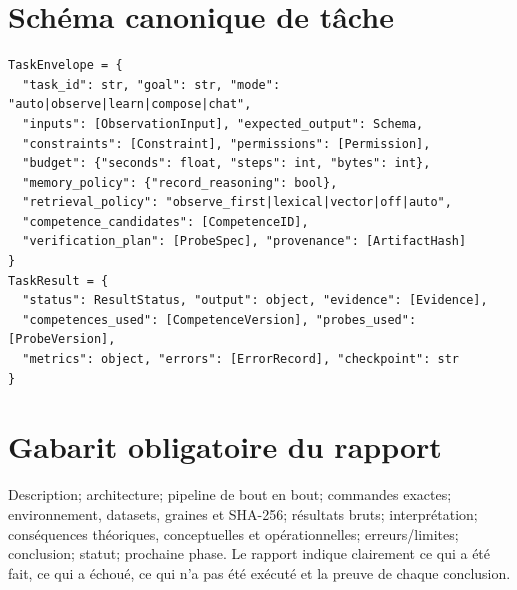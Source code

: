 \documentclass[11pt,a4paper,oneside]{report}
\begin{document}
\appendix
\chapter{Schéma canonique de tâche}
\begin{lstlisting}[basicstyle=\ttfamily\small,breaklines=true]
TaskEnvelope = {
  "task_id": str, "goal": str, "mode": "auto|observe|learn|compose|chat",
  "inputs": [ObservationInput], "expected_output": Schema,
  "constraints": [Constraint], "permissions": [Permission],
  "budget": {"seconds": float, "steps": int, "bytes": int},
  "memory_policy": {"record_reasoning": bool},
  "retrieval_policy": "observe_first|lexical|vector|off|auto",
  "competence_candidates": [CompetenceID],
  "verification_plan": [ProbeSpec], "provenance": [ArtifactHash]
}
TaskResult = {
  "status": ResultStatus, "output": object, "evidence": [Evidence],
  "competences_used": [CompetenceVersion], "probes_used": [ProbeVersion],
  "metrics": object, "errors": [ErrorRecord], "checkpoint": str
}
\end{lstlisting}

\chapter{Gabarit obligatoire du rapport}
Description; architecture; pipeline de bout en bout; commandes exactes; environnement, datasets, graines et SHA-256; résultats bruts; interprétation; conséquences théoriques, conceptuelles et opérationnelles; erreurs/limites; conclusion; statut; prochaine phase. Le rapport indique clairement ce qui a été fait, ce qui a échoué, ce qui n'a pas été exécuté et la preuve de chaque conclusion.
\end{document}
